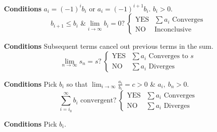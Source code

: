 \documentclass{article}
\begin{document}
\begin{multicols}{2}
\begin{tcolorboxcols}[title={Alternating Series}]
        \textbf{Conditions} $a_i = \left( -1 \right)^i b_i$ or $a_i = \left( -1 \right)^{i+1} b_i$. $b_i>0$.
        \begin{equation*}
            \text{$b_{i+1}\leqslant b_i$ \& $\lim_{i\to\infty}b_i=0$?}\:
            \begin{cases}
                \text{YES} & \text{$\sum a_i$ Converges} \\
                \text{NO}  & \text{Inconclusive}
            \end{cases}
        \end{equation*}
    \end{tcolorboxcols}
    \begin{tcolorboxcols}[title={Telescoping Series}]
        \textbf{Conditions} Subsequent terms cancel out previous terms in the sum.
        \begin{equation*}
            \text{$\lim_{n\to\infty}s_n=s$?}\:
            \begin{cases}
                \text{YES} & \text{$\sum a_i$ Converges to $s$} \\
                \text{NO}  & \text{$\sum a_i$ Diverges}
            \end{cases}
        \end{equation*}
    \end{tcolorboxcols}
    \begin{tcolorboxcols}[title={Limit Comparison Test}]
        \textbf{Conditions} Pick $b_i$ so that $\displaystyle \lim_{i\to\infty}\frac{a_i}{b_i}=c>0$ \& $a_i,\:b_n>0$.
        \begin{equation*}
            \text{$\sum_{i=i_0}^\infty b_i$ convergent?}\:
            \begin{cases}
                \text{YES} & \text{$\sum a_i$ Converges} \\
                \text{NO}  & \text{$\sum a_i$ Diverges}
            \end{cases}
        \end{equation*}
    \end{tcolorboxcols}
    \begin{tcolorboxcols}[title={Comparison Test}]
        \textbf{Conditions} Pick $b_i$.


\end{tcolorboxcols}
\end{multicols}
\end{document}

